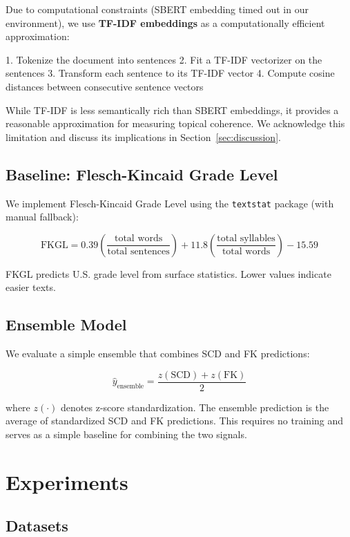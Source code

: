 \documentclass[11pt,letterpaper]{article}
\begin{document}
Due to computational constraints (SBERT embedding timed out in our environment), we use \textbf{TF-IDF embeddings} as a computationally efficient approximation:

1. Tokenize the document into sentences
2. Fit a TF-IDF vectorizer on the sentences
3. Transform each sentence to its TF-IDF vector
4. Compute cosine distances between consecutive sentence vectors

While TF-IDF is less semantically rich than SBERT embeddings, it provides a reasonable approximation for measuring topical coherence. We acknowledge this limitation and discuss its implications in Section~\ref{sec:discussion}.

\subsection{Baseline: Flesch-Kincaid Grade Level}

We implement Flesch-Kincaid Grade Level using the \texttt{textstat} package (with manual fallback):

\begin{equation}
\text{FKGL} = 0.39 \left(\frac{\text{total words}}{\text{total sentences}}\right) + 11.8 \left(\frac{\text{total syllables}}{\text{total words}}\right) - 15.59
\end{equation}

FKGL predicts U.S. grade level from surface statistics. Lower values indicate easier texts.

\subsection{Ensemble Model}

We evaluate a simple ensemble that combines SCD and FK predictions:

\begin{equation}
\hat{y}_{\text{ensemble}} = \frac{z(\text{SCD}) + z(\text{FK})}{2}
\end{equation}

where $z(\cdot)$ denotes z-score standardization. The ensemble prediction is the average of standardized SCD and FK predictions. This requires no training and serves as a simple baseline for combining the two signals.

\section{Experiments}

\subsection{Datasets}
\end{document}
